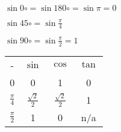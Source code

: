 \documentclass{article}
\begin{document}
\hrulefill

$\sin 0\circ = \sin 180\circ = \sin\pi = 0$

$\sin 45\circ = \sin\frac{\pi}{4}$

$\sin 90\circ = \sin\frac{\pi}{2} = 1$

\hrulefill

\begin{tabular}{c c c c}
-               & $\sin$               & $\cos$               & $\tan$\\
0               & 0                    & 1                    & 0\\
$\frac{\pi}{4}$ & $\frac{\sqrt{2}}{2}$ & $\frac{\sqrt{2}}{2}$ & 1\\
$\frac{\pi}{2}$ & 1                    & 0                    & n/a
\end{tabular}

\hrulefill
\end{document}
